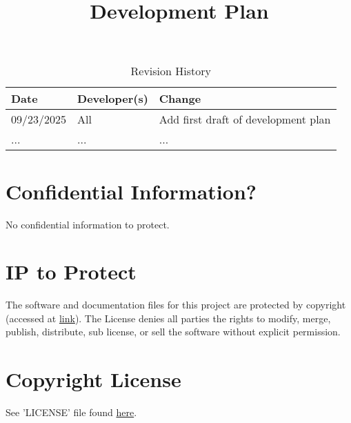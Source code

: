 \documentclass{article}
\title{Development Plan\\\progname}
\author{\authname}
\date{}
\begin{document}
\maketitle

\begin{table}[hp]
\caption{Revision History} \label{TblRevisionHistory}
\begin{tabularx}{\textwidth}{llX}
\toprule
\textbf{Date} & \textbf{Developer(s)} & \textbf{Change}\\
\midrule
09/23/2025 & All & Add first draft of development plan\\
... & ... & ...\\
\bottomrule
\end{tabularx}
\end{table}

\newpage{}



\section{Confidential Information?}

No confidential information to protect.

\section{IP to Protect}

\hspace{\parindent}The software and documentation files for this project are protected by copyright (accessed at \href{https://github.com/mansha71/CapstoneProject/blob/main/LICENSE}{ link}). The License denies all parties the rights to modify, merge, publish, distribute, sub license, or sell the software without explicit permission.

\section{Copyright License}

See 'LICENSE' file found
\href{https://github.com/mansha71/CapstoneProject/blob/main/LICENSE}{here}.
\end{document}
